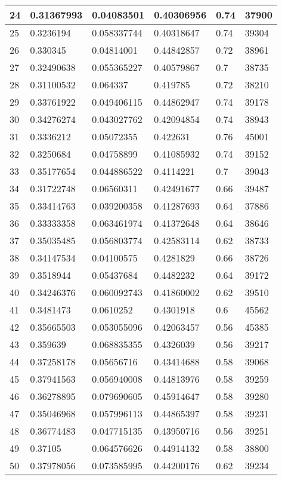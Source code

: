 \begin{longtable}{|l|l|l|l|l|l|}
24 & 0.31367993 & 0.04083501 & 0.40306956 & 0.74 & 37900 \\ \hline 
25 & 0.3236194 & 0.058337744 & 0.40318647 & 0.74 & 39304 \\ \hline 
26 & 0.330345 & 0.04814001 & 0.44842857 & 0.72 & 38961 \\ \hline 
27 & 0.32490638 & 0.055365227 & 0.40579867 & 0.7 & 38735 \\ \hline 
28 & 0.31100532 & 0.064337 & 0.419785 & 0.72 & 38210 \\ \hline 
29 & 0.33761922 & 0.049406115 & 0.44862947 & 0.74 & 39178 \\ \hline 
30 & 0.34276274 & 0.043027762 & 0.42094854 & 0.74 & 38943 \\ \hline 
31 & 0.3336212 & 0.05072355 & 0.422631 & 0.76 & 45001 \\ \hline 
32 & 0.3250684 & 0.04758899 & 0.41085932 & 0.74 & 39152 \\ \hline 
33 & 0.35177654 & 0.044886522 & 0.4114221 & 0.7 & 39043 \\ \hline 
34 & 0.31722748 & 0.06560311 & 0.42491677 & 0.66 & 39487 \\ \hline 
35 & 0.33414763 & 0.039200358 & 0.41287693 & 0.64 & 37886 \\ \hline 
36 & 0.33333358 & 0.063461974 & 0.41372648 & 0.64 & 38646 \\ \hline 
37 & 0.35035485 & 0.056803774 & 0.42583114 & 0.62 & 38733 \\ \hline 
38 & 0.34147534 & 0.04100575 & 0.4281829 & 0.66 & 38726 \\ \hline 
39 & 0.3518944 & 0.05437684 & 0.4482232 & 0.64 & 39172 \\ \hline 
40 & 0.34246376 & 0.060092743 & 0.41860002 & 0.62 & 39510 \\ \hline 
41 & 0.3481473 & 0.0610252 & 0.4301918 & 0.6 & 45562 \\ \hline 
42 & 0.35665503 & 0.053055096 & 0.42063457 & 0.56 & 45385 \\ \hline 
43 & 0.359639 & 0.068835355 & 0.4326039 & 0.56 & 39217 \\ \hline 
44 & 0.37258178 & 0.05656716 & 0.43414688 & 0.58 & 39068 \\ \hline 
45 & 0.37941563 & 0.056940008 & 0.44813976 & 0.58 & 39259 \\ \hline 
46 & 0.36278895 & 0.079690605 & 0.45914647 & 0.58 & 39280 \\ \hline 
47 & 0.35046968 & 0.057996113 & 0.44865397 & 0.58 & 39231 \\ \hline 
48 & 0.36774483 & 0.047715135 & 0.43950716 & 0.56 & 39251 \\ \hline 
49 & 0.37105 & 0.064576626 & 0.44914132 & 0.58 & 38800 \\ \hline 
50 & 0.37978056 & 0.073585995 & 0.44200176 & 0.62 & 39234 \\ \hline 
\end{longtable}